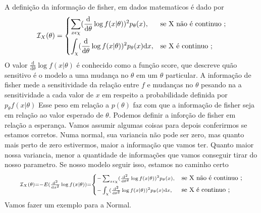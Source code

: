 \documentclass{report}[12pt]
\begin{document}
A definição da informação de fisher, em dados matematicos é dado por
\begin{equation}
    \mathcal{I} _{X}(\theta)= \begin{dcases}
        \sum_{x \epsilon \chi}(\frac{\mathrm{d}}{\mathrm{d}\theta } \log f(x|\theta))^{2}p_{\theta } (x)  , &\text{se X não é continuo   }  ;\\
        \int_{\chi}(\frac{\mathrm{d}}{\mathrm{d}\theta } \log f(x|\theta))^{2}p_{\theta } (x)\mathrm{d}x, &\text{se X é continuo }  ;\\
    \end{dcases} 
\end{equation}
O valor \(\frac{\mathrm{d}}{\mathrm{d}\theta } \log f(x|\theta )\) é conhecido como a função score,
que descreve quão sensitivo é o modelo a uma mudança no \(\theta \) em um \(\theta \) particular. A
informação de fisher mede a sensitividade da relação entre \(f\) e mudanças no \( \theta \) pesando na
a sensitividade a cada valor de \(x\) em respeito a probabilidade definida por \(p_{\theta } f(x|\theta )\) 
Esse peso em relação a \( p(\theta )\) faz com que a informação de fisher seja em relação ao valor
esperado de \(\theta \). Podemos definir a inforção de fisher em relação a esperança.
Vamos assumir algumas coisas para depois conferirmos se estamos corretos. Numa normal, sua variancia
não pode ser zero, mas quanto mais perto de zero estivermos, maior a informação que vamos ter.
Quanto maior nossa variancia, menor a quantidade de informações que vamos conseguir tirar do nosso parametro.
Se nosso modelo seguir isso, estamos no caminho certo
\begin{equation} \scriptstyle
    \mathcal{I} _X(\theta)=-E(\frac{\mathrm{d^{2}}}{\mathrm{d}x^{2} } \log f(x|\theta ))=
    \begin{dcases} 
        \scriptstyle-\sum_{x \epsilon \chi}(\frac{\mathrm{d^{2} }}{\mathrm{d}\theta^{2}  } \log f(x|\theta))^{2}p_{\theta } (x),&\text{\small se X não é continuo };\\
        \scriptstyle-\int_{\chi}(\frac{\mathrm{d^{2} }}{\mathrm{d}\theta^{2}  } \log f(x|\theta))^{2}p_{\theta } (x)\mathrm{d}x,&\text{\small se X é continuo };\\
    \end{dcases}
\end{equation}
Vamos fazer um exemplo para a Normal.
\end{document}

